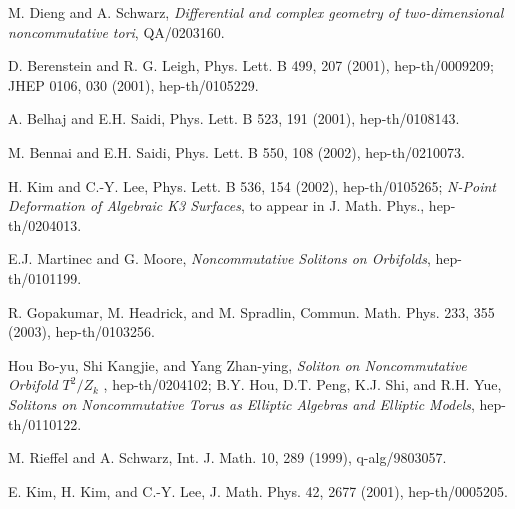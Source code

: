 \documentclass[12pt, a4paper]{article}
\begin{document}
\begin{thebibliography}{88}
 M. Dieng and A. Schwarz, {\it Differential and complex
geometry of two-dimensional noncommutative tori}, QA/0203160.

 D. Berenstein and R. G. Leigh, Phys. Lett. B 499,  207 (2001),
hep-th/0009209; JHEP 0106, 030 (2001), hep-th/0105229.

 A. Belhaj and E.H. Saidi, Phys. Lett. B 523, 191 (2001),
hep-th/0108143.

 M. Bennai and E.H. Saidi, Phys. Lett. B 550, 108 (2002), hep-th/0210073.

 H. Kim and C.-Y. Lee, Phys. Lett. B 536, 154 (2002), hep-th/0105265;
 {\it N-Point Deformation of Algebraic K3 Surfaces}, to appear in
     J. Math. Phys., hep-th/0204013.

  E.J. Martinec and G. Moore, {\it Noncommutative Solitons on Orbifolds},
           hep-th/0101199.

 R. Gopakumar, M. Headrick, and M. Spradlin, Commun. Math. Phys. 233, 355 (2003),
      hep-th/0103256.

 Hou Bo-yu, Shi Kangjie, and Yang Zhan-ying,
{\it Soliton on Noncommutative Orbifold $T^2/Z_k$ },
hep-th/0204102; B.Y. Hou, D.T. Peng, K.J. Shi, and R.H. Yue, {\it
Solitons on Noncommutative Torus as Elliptic Algebras and Elliptic
Models}, hep-th/0110122.




M. Rieffel and A. Schwarz,
Int. J. Math. 10, 289 (1999), q-alg/9803057.

 E. Kim, H. Kim, and C.-Y. Lee,
 J. Math. Phys. 42,  2677 (2001), hep-th/0005205.


\end{thebibliography}
\end{document}

